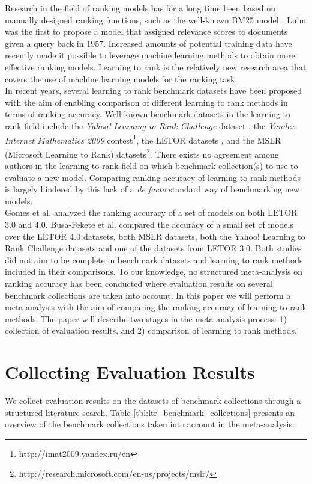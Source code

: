 \documentclass{sig-alternate}
\begin{document}
Research in the field of ranking models has for a long time been based on manually designed ranking functions, such as the well-known BM25 model \cite{Robertson1994}. Luhn \cite{Luhn1957} was the first to propose a model that assigned relevance scores to documents given a query back in 1957. Increased amounts of potential training data have recently made it possible to leverage machine learning methods to obtain more effective ranking models. Learning to rank is the relatively new research area that covers the use of machine learning models for the ranking task.\\

In recent years, several learning to rank benchmark datasets have been proposed with the aim of enabling comparison of different learning to rank methods in terms of ranking accuracy. Well-known benchmark datasets in the learning to rank field include the \emph{Yahoo! Learning to Rank Challenge} dataset \cite{Chapelle2011a}, the \emph{Yandex Internet Mathematics 2009} contest\footnote{http://imat2009.yandex.ru/en}, the LETOR datasets \cite{Qin2010}, and the MSLR (Microsoft Learning to Rank) datasets\footnote{http://research.microsoft.com/en-us/projects/mslr/}. There exists no agreement among authors in the learning to rank field on which benchmark collection(s) to use to evaluate a new model. Comparing ranking accuracy of learning to rank methods is largely hindered by this lack of a \emph{de facto} standard way of benchmarking new models.\\

Gomes et al. \cite{Gomes2013} analyzed the ranking accuracy of a set of models on both LETOR 3.0 and 4.0. Busa-Fekete et al. \cite{Busa-Fekete2013} compared the accuracy of a small set of models over the LETOR 4.0 datasets, both MSLR datasets, both the Yahoo! Learning to Rank Challenge datasets and one of the datasets from LETOR 3.0. Both studies did not aim to be complete in benchmark datasets and learning to rank methods included in their comparisons. To our knowledge, no structured meta-analysis on ranking accuracy has been conducted where evaluation results on several benchmark collections are taken into account. In this paper we will perform a meta-analysis with the aim of comparing the ranking accuracy of learning to rank methods. The paper will describe two stages in the meta-analysis process: 1) collection of evaluation results, and 2) comparison of learning to rank methods.

\section{Collecting Evaluation Results}
\label{sec:collecting_evaluation_results}
We collect evaluation results on the datasets of benchmark collections through a structured literature search. Table \ref{tbl:ltr_benchmark_collections} presents an overview of the benchmark collections taken into account in the meta-analysis:
\end{document}
